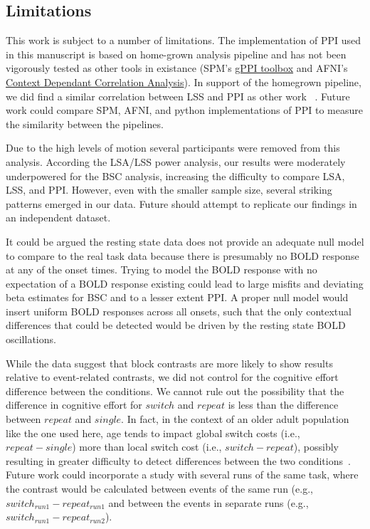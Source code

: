 \documentclass[phd,appendix,figures]{uithesis}
\begin{document}
\subsection{Limitations}
This work is subject to a number of limitations.
The implementation of PPI used in this manuscript is based on
home-grown analysis pipeline and has not been vigorously tested
as other tools in existance (SPM's \href{https://www.nitrc.org/projects/gppi}{gPPI toolbox}
and AFNI's \href{https://afni.nimh.nih.gov/CD-CorrAna}{Context Dependant Correlation Analysis}).
In support of the homegrown pipeline, we did find a similar correlation between LSS and PPI as
other work ~\cite{Di2019a}.
Future work could compare SPM, AFNI, and python implementations of PPI to measure the similarity
between the pipelines.

Due to the high levels of motion several participants were removed from this analysis.
According the LSA/LSS power analysis, our results were moderately underpowered for the BSC analysis,
increasing the difficulty to compare LSA, LSS, and PPI.
However, even with the smaller sample size, several striking patterns emerged in our data.
Future should attempt to replicate our findings in an independent dataset.

It could be argued the resting state data does not provide an adequate null model
to compare to the real task data because there is presumably no BOLD response at any
of the onset times.
Trying to model the BOLD response with no expectation of a BOLD response existing could lead
to large misfits and deviating beta estimates for BSC and to a lesser extent PPI.
A proper null model would insert uniform BOLD responses across all onsets, such that
the only contextual differences that could be detected would be driven by the
resting state BOLD oscillations.

While the data suggest that block contrasts are more likely to show results relative to event-related contrasts,
we did not control for the cognitive effort difference between the conditions.
We cannot rule out the possibility that the difference in cognitive effort for
$switch$ and $repeat$ is less than the difference between $repeat$ and $single$.
In fact, in the context of an older adult population like the one used here,
age tends to impact global switch costs (i.e., $repeat - single$) more than local
switch cost (i.e., $switch - repeat$), possibly resulting in greater difficulty to detect
differences between the two conditions~\cite{Wasylyshyn2011}.
Future work could incorporate a study with several runs of the same task, where
the contrast would be calculated between events of the same run (e.g., $switch_{run1} - repeat_{run1}$
and between the events in separate runs (e.g., $switch_{run1} - repeat_{run2}$).
\end{document}
